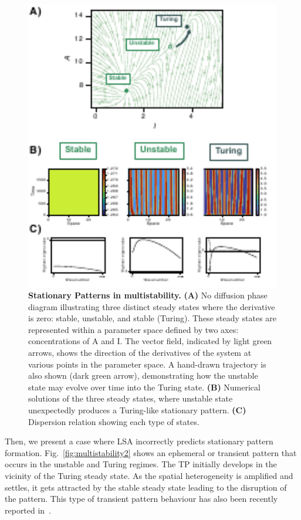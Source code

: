 \begin{figure}[H] %
    \centering
    \begin{adjustbox}{center}
        \includegraphics[width=1\textwidth]{chapters/Chapter 1/multistability1} %
    \end{adjustbox}
    \caption{\textbf{Stationary Patterns in multistability.} \textbf{(A)} No diffusion phase diagram illustrating three distinct steady states where the derivative is zero: stable, unstable, and stable (Turing). These steady states are represented within a parameter space defined by two axes: concentrations of A and I. The vector field, indicated by light green arrows, shows the direction of the derivatives of the system at various points in the parameter space. A hand-drawn trajectory is also shown (dark green arrow), demonstrating how the unstable state may evolve over time into the Turing state. \textbf{(B)} Numerical solutions of the three steady states, where unstable state unexpectedly produces a Turing-like stationary pattern. \textbf{(C)} Dispersion relation showing each type of states.}
    \label{fig:multistability1} %
\end{figure}
Then, we present a case where LSA incorrectly predicts stationary pattern formation.
Fig.~\ref{fig:multistability2} shows an ephemeral or transient pattern that occurs in the unstable and Turing regimes.
The TP initially develops in the vicinity of the Turing steady state.
As the spatial heterogeneity is amplified and settles, it gets attracted by the stable steady state leading to the disruption of the pattern.
This type of transient pattern behaviour has also been recently reported in~\cite{Krause2023}.

